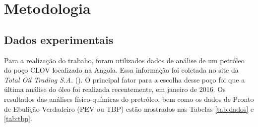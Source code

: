 \section{Metodologia}

\subsection{Dados experimentais}

Para a realização do trabaho, foram utilizados dados de análise de um
petróleo do poço CLOV localizado na Angola. Essa informação foi
coletada no site da \emph{Total Oil Trading S.A.} (\citeauthor{TOTSA2016}). O
principal fator para a escolha desse poço foi que a última análise do óleo foi
realizada recentemente, em janeiro de 2016. Os resultados das análises
físico-químicas do pretróleo, bem como os dados de Pronto de Ebulição Verdadeiro
(PEV ou TBP) estão mostrados nas Tabelas \ref{tab:dados} e \ref{tab:tbp}.


